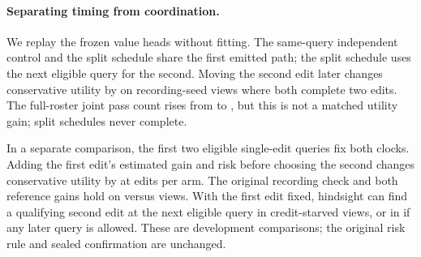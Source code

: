 \paragraph{Separating timing from coordination.}
We replay the frozen value heads without fitting. The same-query
independent control and the split schedule share the first emitted
path; the split schedule uses the next eligible query for the
second. Moving the second edit later changes conservative utility by
\CrossTiming{} on \CrossCommon{} recording-seed views where both
complete two edits. The full-roster joint pass count rises from
\CrossSamePass{} to \CrossSplitPass{}, but this is not a matched
utility gain; \CrossIncomplete{} split schedules never complete.

In a separate comparison, the first two eligible single-edit queries
fix both clocks. Adding the first edit's estimated gain and risk
before choosing the second changes conservative utility by
\CrossJoint{} at \CrossEdits{} edits per arm. The original recording
check and both reference gains hold on \CrossJointPass{} versus
\CrossIndependentPass{} views. With the first edit fixed, hindsight
can find a qualifying second edit at the next eligible query in
\CrossNext{} credit-starved views, or in \CrossAny{} if any later
query is allowed. These are development comparisons; the original
risk rule and sealed confirmation are unchanged.
